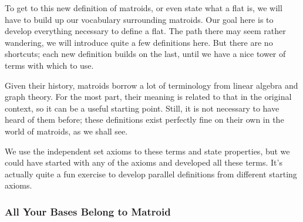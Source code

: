 \documentclass[12pt,oneside]{../../sfsuthesis}
\begin{document}
To get to this new definition of matroids, or even state what a flat is, we will have to build up our vocabulary surrounding matroids.
Our goal here is to develop everything necessary to define a flat.
The path there may seem rather wandering, we will introduce quite a few definitions here.
But there are no shortcuts; each new definition builds on the last, until we have a nice tower of terms with which to use.

Given their history, matroids borrow a lot of terminology from linear algebra and graph theory.
For the most part, their meaning is related to that in the original context, so it can be a useful starting point.
Still, it is not necessary to have heard of them before;
these definitions exist perfectly fine on their own in the world of matroids, as we shall see.

We use the independent set axioms to these terms and state properties, but we could have started with any of the axioms and developed all these terms.
It's actually quite a fun exercise to develop parallel definitions from different starting axioms.

\subsubsection{All Your Bases Belong to Matroid}
\end{document}
